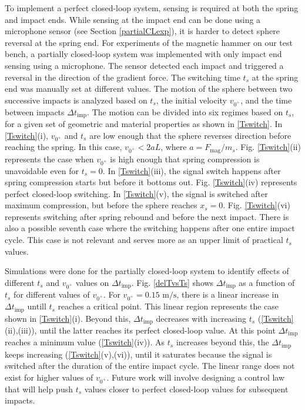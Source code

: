 \documentclass[letterpaper, 10 pt, conference]{ieeeconf}  %
\begin{document}
To implement a perfect closed-loop system, sensing is required at both the spring and impact ends. While sensing at the impact end can be done using a microphone sensor (see Section \ref{partialCLexp}), it is harder to detect sphere reversal at the spring end. For experiments of the magnetic hammer on our test bench, a partially closed-loop system was implemented with only impact end sensing using a microphone. The sensor detected each impact and triggered a reversal in the direction of the gradient force. The switching time $t_s$ at the spring end was manually set at different values. The motion of the sphere between two successive impacts is analyzed based on $t_s$, the initial velocity $v_{0^+}$, and the time between impacts $\Delta t_{\textrm{imp}}$. The motion can be divided into six regimes based on $t_s$, for a given set of geometric and material properties as shown in \cref{Tswitch}. In \cref{Tswitch}(i), $v_{0^+}$ and $t_s$ are low enough that the sphere reverses direction before reaching the spring. In this case, $v_{0^+} < 2aL$, where $a=F_{\textrm{mag}}/m_s$. Fig. \ref{Tswitch}(ii) represents the case when $v_{0^+}$ is high enough that spring compression is unavoidable even for $t_s = 0$. In \cref{Tswitch}(iii), the signal switch happens after spring compression starts but before it bottoms out. Fig. \ref{Tswitch}(iv) represents perfect closed-loop switching. In \cref{Tswitch}(v), the signal is switched after maximum compression, but before the sphere reaches $x_s=0$. Fig. \ref{Tswitch}(vi) represents switching after spring rebound and before the next impact. There is also a possible seventh case where the switching happens after one entire impact cycle. This case is not relevant and serves more as an upper limit of practical $t_s$ values. 

Simulations were done for the partially closed-loop system to identify effects of different $t_s$ and $v_{0^+}$ values on $\Delta t_{\textrm{imp}}$. Fig. \ref{delTvsTs} shows $\Delta t_{\textrm{imp}}$ as a function of $t_s$ for different values of $v_{0^+}$. For $v_{0^+}=0.15\text{ m/s}$, there is a linear increase in $\Delta t_{\textrm{imp}}$ untill $t_s$ reaches a critical point. This linear region represents the case shown in \cref{Tswitch}(i). Beyond this, $\Delta t_{\textrm{imp}}$ decreases with increasing $t_s$ (\cref{Tswitch}(ii),(iii)), until the latter reaches its perfect closed-loop value. At this point $\Delta t_{\textrm{imp}}$ reaches a minimum value (\cref{Tswitch}(iv)). As $t_s$ increases beyond this, the $\Delta t_{\textrm{imp}}$ keeps increasing (\cref{Tswitch}(v),(vi)), until it saturates because the signal is switched after the duration of the entire impact cycle. The linear range does not exist for higher values of $v_{0^+}$. Future work will involve designing a control law that will help push $t_s$ values closer to perfect closed-loop values for subsequent impacts.
\end{document}
